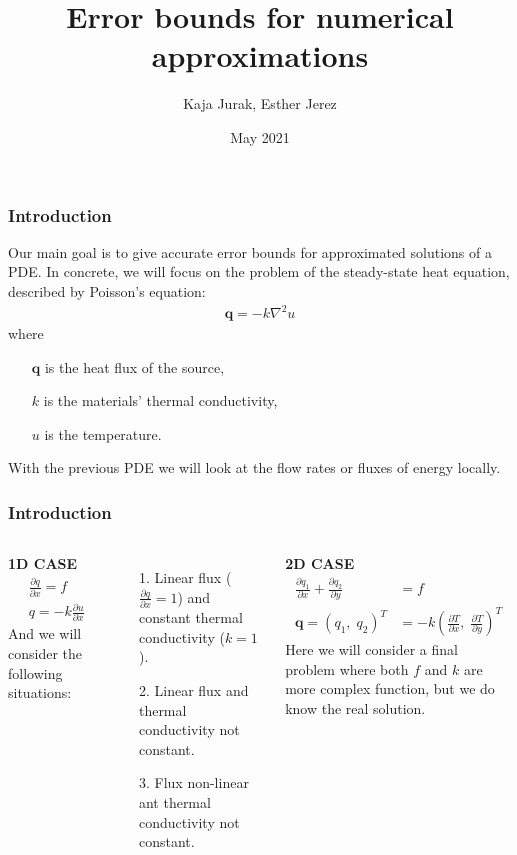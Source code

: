 \documentclass[t]{beamer}
\title{Error bounds for numerical approximations}
\author[MAT264] 
{Kaja Jurak, Esther Jerez}
\institute[UIB]
{
	Faculty of Mathematics\\
	University of Bergen
	
}
\date[2021]
{May 2021}
\begin{document}
	\frame{\titlepage}
	\begin{frame}
	\frametitle{Introduction}
	Our main goal is to give accurate error bounds for approximated solutions of a PDE. In concrete, we will focus on the problem of the steady-state heat equation, described by  \alert{Poisson's equation}:
	\begin{align*}
	\bm{q} = -k \nabla ^2 u
	\end{align*}
	where 
	\begin{enumerate}
		\item[] $\bm{q}$ is the heat flux of the source,
		\item[] $k$ is the materials' thermal conductivity,
		\item[] $u$ is the temperature.
	\end{enumerate}
	With the previous PDE we will look at the flow rates or fluxes of energy locally. \\
	
	
\end{frame}

\begin{frame}
\frametitle{Introduction}
\begin{columns}[t]
	\textbf{1D CASE}
	\begin{align*}
	&\frac{\partial q}{\partial x} = f \\
	&q = -k \frac{\partial u}{\partial x} 
	\end{align*}
	And we will consider the following situations:
	\begin{itemize}
		\item[1.] Linear flux ($\frac{\partial q}{\partial x} = 1$) and constant thermal conductivity ($k=1$).
		\item[2.] Linear flux and thermal conductivity not constant.
		\item[3.] Flux non-linear ant thermal conductivity not constant.
	\end{itemize}
	
	\textbf{2D CASE} \\
	\begin{align*}
	\frac{\partial q_1}{\partial x} + \frac{\partial q_2}{\partial y}  &= f \\
	\bm{q} = (q_1,\; q_2)^T  &= -k \left( \frac{\partial T}{\partial x} ,\; \frac{\partial T}{\partial y}\right)^T
	\end{align*}
	Here we will consider a final problem where both $f$ and $k$ are more complex function, but we do know the real solution.
\end{columns}        
\end{frame}
\end{document}
